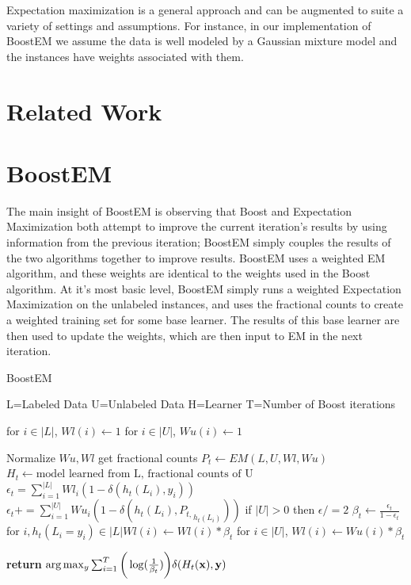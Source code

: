 \documentclass{sig-alternate}
\begin{document}
Expectation maximization is a general approach and can be augmented to suite a variety of settings and assumptions.  For instance, in our implementation of BoostEM we assume the data is well modeled by a Gaussian mixture model and the instances have weights associated with them.    

     
\section{Related Work}
\section{BoostEM}
The main insight of BoostEM is observing that Boost and Expectation Maximization both attempt to improve the current iteration's results by using information from the previous iteration; BoostEM simply couples the results of the two algorithms together to improve results.  BoostEM uses a weighted EM algorithm, and these weights are identical to the weights used in the Boost algorithm.  At it's most basic level, BoostEM simply runs a weighted Expectation Maximization on the unlabeled instances, and uses the fractional counts to create a weighted training set for some base learner.  The results of this base learner are then used to update the weights, which are then input to EM in the next iteration. 


\begin{algorithm}
\caption{BoostEM}\label{euclid}
\begin{algorithmic}[1]
\State L=Labeled Data
\State U=Unlabeled Data
\State H=Learner
\State T=Number of Boost iterations

\State for $i \in |L|$, $ Wl(i) \gets 1$
\State for $i \in |U|$, $ Wu(i) \gets 1$

\State Normalize $Wu,Wl$
\State get fractional counts $P_{t} \gets EM(L,U,Wl,Wu)$
\State $H_{t} \gets \text{model learned from L, fractional counts of U}$
\State $\epsilon_{t} = \sum_{i=1}^{|L|} Wl_{i}(1-\delta(h_{t}(L_{i}),y_{i}))$
\State $\epsilon_{t} += \sum_{i=1}^{|U|} Wu_{i}(1-\delta(h_{t}(L_{i}),{P_{t,}}_{h_{t}(L_{i})}))$
\State if $|U| > 0$ then $\epsilon /= 2$
\State $\beta_{t} \gets \frac{\epsilon_{t}}{1-\epsilon_{t}}$
\State for $i,h_{t}(L_{i} = y_{i}) \in |L| Wl(i) \gets Wl(i)*\beta_{t}$
\State for $i \in |U|$, $Wl(i) \gets Wu(i)*\beta_{t}$

\EndFor
\State \textbf{return} $\arg \max_{y} \sum_{i=1}^{T}\bigg(\log(\frac{1}{\beta_{t}})\bigg) \delta(H_{t}(\bf{x}),y)$
\EndProcedure
\end{algorithmic}
\end{algorithm}
\end{document}
